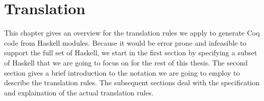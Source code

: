 \chapter{Translation} \label{chp:translation}

This chapter gives an overview for the translation rules we apply to generate Coq code from Haskell modules.
Because it would be error prone and infeasible to support the full set of Haskell, we start in the first section by specifying a subset of Haskell that we are going to focus on for the rest of this thesis.
The second section gives a brief introduction to the notation we are going to employ to describe the translation rules.
The subsequent sections deal with the specification and explaination of the actual translation rules.







